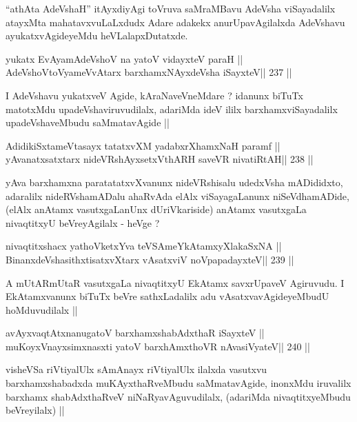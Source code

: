 \begin{artha}
``athAta AdeVshaH'' itAyxdiyAgi toVruva saMraMBavu AdeVsha
  viSayadalilx atayxMta mahatavxvuLaLxdudx Adare adakekx
  anurUpavAgilalxda AdeVshavu ayukatxvAgideyeMdu heVLalapxDutatxde.
\end{artha}


\begin{shl}
yukatx EvAyamAdeVshoV na yatoV vidayxteV paraH ||
AdeVshoV\s toV\s yameVvAtarx barxhamxNAyxdeVsha iSayxteV\hfill || 237 ||
\end{shl}

\begin{artha}
I AdeVshavu yukatxveV Agide, kAraNaveVneMdare ? idanunx biTuTx
matotxMdu upadeVshaviruvudilalx, adariMda ideV ililx
barxhamxviSayadalilx upadeVshaveMbudu saMmatavAgide ||
\end{artha}

\begin{shl}
AdidikiSxtameVtasayx tatatxvXM yadabxrXhamxNaH paramf ||
yAvanatxsatxtarx nideVRshAyxsetxV\s thARH saveVR nivatiRtAH\hfill || 238 ||
\end{shl}

\begin{artha}
yAva barxhamxna paratatatxvXvanunx nideVRshisalu udedxVsha mADididxto,
adaralilx nideRVshamADalu ahaRvAda elAlx viSayagaLanunx
niSeVdhamADide, (elAlx anAtamx vasutxgaLanUnx dUriVkariside)
anAtamx vasutxgaLa nivaqtitxyU beVreyAgilalx - heVge ?
\end{artha}

\begin{shl}
nivaqtitxshacx yathoVketxYva teVSAmeYkAtamxyXlakaSxNA ||
BinanxdeVshasithxtisatxvXtarx vAsatxviV noVpapadayxteV\hfill || 239 ||
\end{shl}

\begin{artha}
A mUtARmUtaR vasutxgaLa nivaqtitxyU EkAtamx savxrUpaveV Agiruvudu. I
EkAtamxvanunx biTuTx beVre sathxLadalilx adu vAsatxvavAgideyeMbudU
hoMduvudilalx ||
\end{artha}


\begin{shl}
avAyxvaqtAtxnanugatoV barxhamxshabAdxthaR iSayxteV ||
muKoyxV\s nayxsimxnasxti yatoV barxhAmxthoVR nAvasiVyateV\hfill || 240 ||
\end{shl}

\begin{artha}
visheVSa riVtiyalUlx sAmAnayx riVtiyalUlx ilalxda vasutxvu
barxhamxshabadxda muKAyxthaRveMbudu saMmatavAgide, inonxMdu iruvalilx
barxhamx shabAdxthaRveV niNaRyavAguvudilalx, (adariMda nivaqtitxyeMbudu
beVreyilalx) ||
\end{artha}

